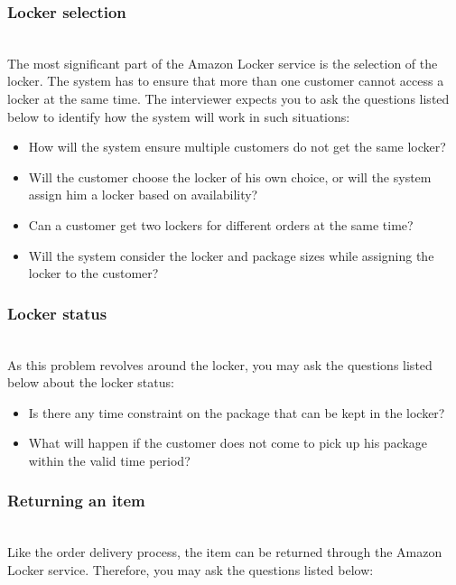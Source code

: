 \subsubsection{Locker selection}\label{CIqvzGObCrqWqqJxGH0sd}
\\
The most significant part of the Amazon Locker service is the selection of the locker. The system has to ensure that more than one customer cannot access a locker at the same time. The interviewer expects you to ask the questions listed below to identify how the system will work in such situations:

\begin{itemize}
\item
\protect{}\label{Xgnx0qktFm9M9kW4vwSEP}
How will the system ensure multiple customers do not get the same locker?
\item
\protect{}\label{0NoKBCFwxR00SJAr9MT5X}
Will the customer choose the locker of his own choice, or will the system assign him a locker based on availability?
\item
\protect{}\label{q2KrwWQLPTshJW-ct99tA}
Can a customer get two lockers for different orders at the same time?
\item
\protect{}\label{DjD0HpvDQkl6LZbLm-RVs}
Will the system consider the locker and package sizes while assigning the locker to the customer?
\end{itemize}

\subsubsection{Locker status}\label{IUVLxJ2I6kqFVOzbd8z5b}
\\
As this problem revolves around the locker, you may ask the questions listed below about the locker status:

\begin{itemize}
\item
\protect{}\label{fYSxOPi94kUDAv4d_JX3H}
Is there any time constraint on the package that can be kept in the locker?
\item
\protect{}\label{G9kuY3XeGv-58Z03Jgn0E}
What will happen if the customer does not come to pick up his package within the valid time period?
\end{itemize}

\subsubsection{Returning an item}\label{VtANmyUgKnpIYMCLsPfl_}
\\
Like the order delivery process, the item can be returned through the Amazon Locker service. Therefore, you may ask the questions listed below:

